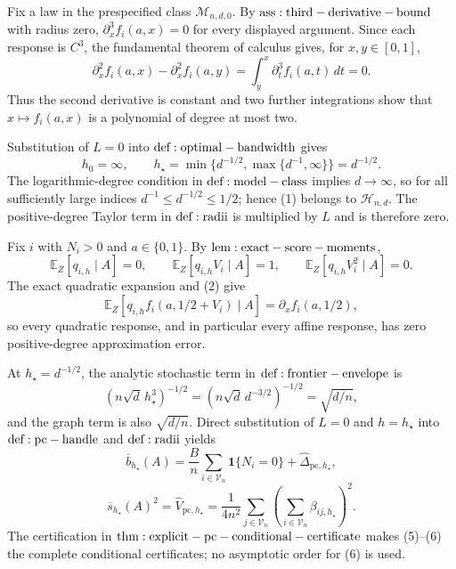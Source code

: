 Fix a law in the prespecified class \(\mathcal M_{n,d,0}\).  By \({\rm ass:third-derivative-bound}\) with radius zero, \(\partial_x^3f_i(a,x)=0\) for every displayed argument.  Since each response is \(C^3\), the fundamental theorem of calculus gives, for \(x,y\in[0,1]\),
\[
 \partial_x^2f_i(a,x)-\partial_x^2f_i(a,y)
 =\int_y^x\partial_t^3f_i(a,t)\,dt=0.
\]
Thus the second derivative is constant and two further integrations show that \(x\mapsto f_i(a,x)\) is a polynomial of degree at most two.

Substitution of \(L=0\) into \({\rm def:optimal-bandwidth}\) gives
\[
 h_0=\infty,
 \qquad h_\star=\min\{d^{-1/2},\max\{d^{-1},\infty\}\}=d^{-1/2}.
\tag{1}
\]
The logarithmic-degree condition in \({\rm def:model-class}\) implies \(d\to\infty\), so for all sufficiently large indices \(d^{-1}\leq d^{-1/2}\leq1/2\); hence (1) belongs to \(\mathcal H_{n,d}\).  The positive-degree Taylor term in \({\rm def:radii}\) is multiplied by \(L\) and is therefore zero.

Fix \(i\) with \(N_i>0\) and \(a\in\{0,1\}\).  By \({\rm lem:exact-score-moments}\),
\[
 \mathbb E_Z[q_{i,h}\mid A]=0,
 \qquad \mathbb E_Z[q_{i,h}V_i\mid A]=1,
 \qquad \mathbb E_Z[q_{i,h}V_i^2\mid A]=0.
\tag{2}
\]
The exact quadratic expansion and (2) give
\[
 \mathbb E_Z[q_{i,h}f_i(a,1/2+V_i)\mid A]=\partial_xf_i(a,1/2),
\tag{3}
\]
so every quadratic response, and in particular every affine response, has zero positive-degree approximation error.

At \(h_\star=d^{-1/2}\), the analytic stochastic term in \({\rm def:frontier-envelope}\) is
\[
 (n\sqrt d\,h_\star^3)^{-1/2}
 =(n\sqrt d\,d^{-3/2})^{-1/2}=\sqrt{d/n},
\tag{4}
\]
and the graph term is also \(\sqrt{d/n}\).  Direct substitution of \(L=0\) and \(h=h_\star\) into \({\rm def:pc-handle}\) and \({\rm def:radii}\) yields
\[
 \overline b_{h_\star}(A)
 =\frac Bn\sum_{i\in\mathcal V_n}\mathbf1\{N_i=0\}
 +\widehat\Delta_{\mathrm{pc},h_\star},
\tag{5}
\]
\[
 \overline s_{h_\star}(A)^2
 =\widehat V_{\mathrm{pc},h_\star}
 =\frac1{4n^2}\sum_{j\in\mathcal V_n}
 \left(\sum_{i\in\mathcal V_n}\beta_{ij,h_\star}\right)^2.
\tag{6}
\]
The certification in \({\rm thm:explicit-pc-conditional-certificate}\) makes (5)--(6) the complete conditional certificates; no asymptotic order for (6) is used.

